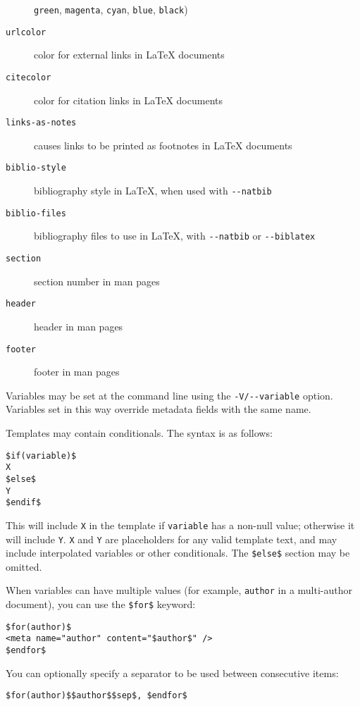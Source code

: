 \documentclass[]{article}
\begin{document}
\begin{description}
\texttt{green}, \texttt{magenta}, \texttt{cyan}, \texttt{blue},
\texttt{black})
\item[\texttt{urlcolor}]
color for external links in LaTeX documents
\item[\texttt{citecolor}]
color for citation links in LaTeX documents
\item[\texttt{links-as-notes}]
causes links to be printed as footnotes in LaTeX documents
\item[\texttt{biblio-style}]
bibliography style in LaTeX, when used with \texttt{-{}-natbib}
\item[\texttt{biblio-files}]
bibliography files to use in LaTeX, with \texttt{-{}-natbib} or
\texttt{-{}-biblatex}
\item[\texttt{section}]
section number in man pages
\item[\texttt{header}]
header in man pages
\item[\texttt{footer}]
footer in man pages
\end{description}

Variables may be set at the command line using the
\texttt{-V/-{}-variable} option. Variables set in this way override
metadata fields with the same name.

Templates may contain conditionals. The syntax is as follows:

\begin{verbatim}
$if(variable)$
X
$else$
Y
$endif$
\end{verbatim}

This will include \texttt{X} in the template if \texttt{variable} has a
non-null value; otherwise it will include \texttt{Y}. \texttt{X} and
\texttt{Y} are placeholders for any valid template text, and may include
interpolated variables or other conditionals. The \texttt{\$else\$}
section may be omitted.

When variables can have multiple values (for example, \texttt{author} in
a multi-author document), you can use the \texttt{\$for\$} keyword:

\begin{verbatim}
$for(author)$
<meta name="author" content="$author$" />
$endfor$
\end{verbatim}

You can optionally specify a separator to be used between consecutive
items:

\begin{verbatim}
$for(author)$$author$$sep$, $endfor$
\end{verbatim}
\end{document}
